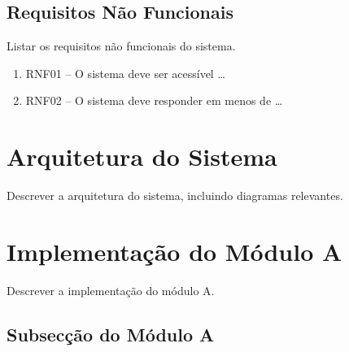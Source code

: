 \subsection{Requisitos Não Funcionais}
\label{subsec:req_nao_funcionais}

Listar os requisitos não funcionais do sistema.

\begin{enumerate}
    \item RNF01 -- O sistema deve ser acessível \ldots
    \item RNF02 -- O sistema deve responder em menos de \ldots
\end{enumerate}

\section{Arquitetura do Sistema}
\label{sec:arquitetura}


Descrever a arquitetura do sistema, incluindo diagramas relevantes.


\section{Implementação do Módulo A}
\label{sec:modulo_a}


Descrever a implementação do módulo A.

\subsection{Subsecção do Módulo A}
\label{subsec:modulo_a_sub}

